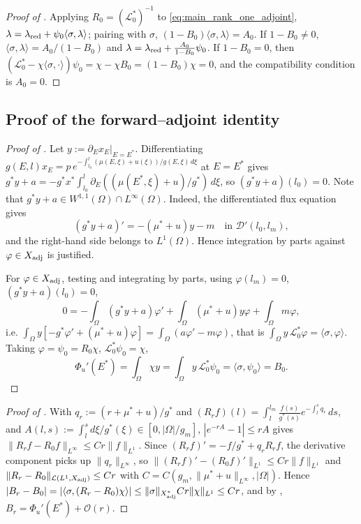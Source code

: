 \documentclass[a4paper,fleqn,longmktitle]{cas-sc}
\theoremstyle{plain}
\theoremstyle{definition}
\theoremstyle{remark}
\numberwithin{equation}{section}
\begin{document}
\begin{proof}[Proof of ]
Applying \(R_0=(\mathcal L_0^*)^{-1}\) to \eqref{eq:main_rank_one_adjoint},
\(\lambda=\lambda_{\rm red}+\psi_0\langle\sigma,\lambda\rangle\); pairing with
\(\sigma\), \((1-B_0)\langle\sigma,\lambda\rangle=A_0\). If \(1-B_0\ne0\),
\(\langle\sigma,\lambda\rangle=A_0/(1-B_0)\) and
\(\lambda=\lambda_{\rm red}+\tfrac{A_0}{1-B_0}\psi_0\). If \(1-B_0=0\), then
\((\mathcal L_0^*-\chi\langle\sigma,\cdot\rangle)\psi_0=\chi-\chi B_0=(1-B_0)\chi=0\),
and the compatibility condition is \(A_0=0\).
\end{proof}
\subsection{Proof of the forward--adjoint identity}
\label{subsec:proof_forward_adjoint}
\begin{proof}[Proof of ]
Let \(y:=\partial_E x_E|_{E=E^*}\). Differentiating
\(g(E,l)x_E=p\,e^{-\int_{l_0}^l(\mu(E,\xi)+u(\xi))/g(E,\xi)\,d\xi}\) at \(E=E^*\)
gives
\(g^*y+a=-g^*x^*\int_{l_0}^l\partial_E((\mu(E^*,\xi)+u)/g^*)\,d\xi\), so
\((g^*y+a)(l_0)=0\).
Note that
$g^*y+a\in W^{1,1}(\Omega)\cap L^\infty(\Omega)$.
Indeed, the differentiated flux equation gives
\[
    (g^*y+a)'=-(\mu^*+u)y-m
    \quad\text{in }\mathcal D'(l_0,l_m),
\]
and the right-hand side belongs to \(L^1(\Omega)\). Hence integration by parts
against \(\varphi\in X_{\rm adj}\) is justified.

For \(\varphi\in X_{\rm adj}\), testing and integrating by parts,
using \(\varphi(l_m)=0\), \((g^*y+a)(l_0)=0\),
\[
    0=
    -\int_\Omega(g^*y+a)\varphi'
    +
    \int_\Omega(\mu^*+u)y\varphi
    +
    \int_\Omega m\varphi,
\]
i.e. \(\int_\Omega y[-g^*\varphi'+(\mu^*+u)\varphi]=\int_\Omega(a\varphi'-m\varphi)\),
that is \(\int_\Omega y\,\mathcal L_0^*\varphi=\langle\sigma,\varphi\rangle\).
Taking \(\varphi=\psi_0=R_0\chi\), \(\mathcal L_0^*\psi_0=\chi\),
\[
    \Phi_u'(E^*)
    =
    \int_\Omega\chi y
    =
    \int_\Omega y\,\mathcal L_0^*\psi_0
    =
    \langle\sigma,\psi_0\rangle
    =
    B_0.
\]
\end{proof}
\begin{proof}[Proof of ]
With \(q_r:=(r+\mu^*+u)/g^*\) and
\((R_rf)(l)=\int_l^{l_m}\tfrac{f(s)}{g^*(s)}e^{-\int_l^s q_r}\,ds\), and
\(A(l,s):=\int_l^s d\xi/g^*(\xi)\in[0,|\Omega|/g_m]\),
\(|e^{-rA}-1|\le rA\) gives \(\|R_rf-R_0f\|_{L^\infty}\le Cr\|f\|_{L^1}\). Since
\((R_rf)'=-f/g^*+q_rR_rf\), the derivative component picks up
\(\|q_r\|_{L^\infty}\), so \(\|(R_rf)'-(R_0f)'\|_{L^1}\le Cr\|f\|_{L^1}\) and
\(\|R_r-R_0\|_{\mathcal L(L^1,X_{\rm adj})}\le Cr\) with
\(C=C(g_m,\|\mu^*+u\|_{L^\infty},|\Omega|)\). Hence
\(|B_r-B_0|=|\langle\sigma,(R_r-R_0)\chi\rangle|
\le\|\sigma\|_{X_{\rm adj}^*}Cr\|\chi\|_{L^1}\le Cr\), and by
,
\(B_r=\Phi_u'(E^*)+\mathcal O(r)\).
\end{proof}
\end{document}
